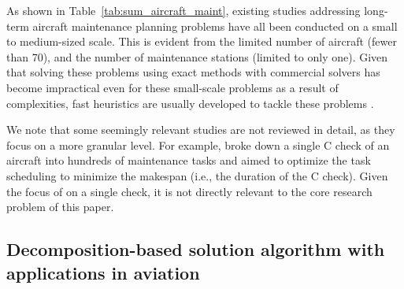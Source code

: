 As shown in Table~\ref{tab:sum_aircraft_maint}, existing studies addressing long-term aircraft maintenance planning problems have all been conducted on a small to medium-sized scale. This is evident from the limited number of aircraft (fewer than 70), and the number of maintenance stations (limited to only one).
Given that solving these problems using exact methods with commercial solvers has become impractical even for these small-scale problems as a result of complexities, fast heuristics are usually developed to tackle these problems \citep{wang2024collaboration}.

We note that some seemingly relevant studies are not reviewed in detail, as they focus on a more granular level. For example, \cite{chen2024resource} broke down a single C check of an aircraft into hundreds of maintenance tasks and aimed to optimize the task scheduling to minimize the makespan (i.e., the duration of the C check). Given the focus of \cite{chen2024resource} on a single check, it is not directly relevant to the core research problem of this paper. 


\subsection{Decomposition-based solution algorithm with applications in aviation}
\label{sec:SolApproach}


